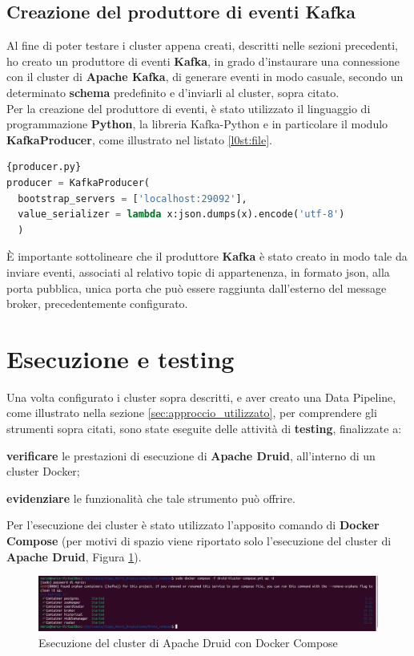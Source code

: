 \subsection{Creazione del produttore di eventi Kafka}
Al fine di poter testare i \gls{cluster}{} appena creati, descritti nelle sezioni precedenti, ho creato 
un produttore di eventi \textbf{Kafka}, 
in grado d'instaurare una connessione con il \gls{cluster}{} di \textbf{Apache Kafka}, di 
generare eventi in modo casuale, secondo un determinato \textbf{schema} predefinito e d'inviarli al \gls{cluster}{}, sopra citato.
\\Per la creazione del produttore di eventi, è stato utilizzato il linguaggio di programmazione \textbf{Python}, la libreria \gls{Kafka-Python}{} e in particolare il modulo \textbf{KafkaProducer}, come illustrato nel listato \ref{l0st:file}.
\begin{lstlisting}[language=Python, caption=\texttt{producer.py}, label=l0st:file]{producer.py}
producer = KafkaProducer(  
  bootstrap_servers = ['localhost:29092'],  
  value_serializer = lambda x:json.dumps(x).encode('utf-8')  
  )  
\end{lstlisting}
È importante sottolineare che il produttore \textbf{Kafka} è stato creato in modo tale da inviare  eventi, associati al relativo \gls{topic}{} di appartenenza, in formato \gls{json}{},
alla porta pubblica, unica porta che può essere raggiunta dall'esterno
del \gls{message broker}{}, precedentemente configurato.
\pagebreak
\section{Esecuzione e testing}
Una volta configurato i \gls{cluster}{} sopra descritti, e aver creato una \gls{Data Pipeline}{}, come illustrato nella sezione \ref{sec:approccio_utilizzato}, 
per comprendere gli strumenti sopra citati, sono state eseguite delle attività di \textbf{testing}, finalizzate a:
\begin{list}{*}
    \item \textbf{verificare} le prestazioni di esecuzione di \textbf{Apache Druid}, all'interno di un \gls{cluster}{} \gls{Docker}{};
   \item  \item \textbf{evidenziare} le funzionalità che tale strumento può offrire.
\end{list}
\noindent
Per l'esecuzione dei \gls{cluster}{} è stato utilizzato l'apposito comando di \textbf{Docker Compose} (per motivi di spazio viene riportato solo 
l'esecuzione del \gls{cluster}{} di \textbf{Apache Druid}, Figura \ref{fig:druid_compose}).
\begin{figure}[h]
  \centering
  \includegraphics[width=1\textwidth]{images/percorso/druid_cluster.png}
  \caption{Esecuzione del cluster di Apache Druid con Docker Compose}
  \label{fig:druid_compose}
\end{figure}

